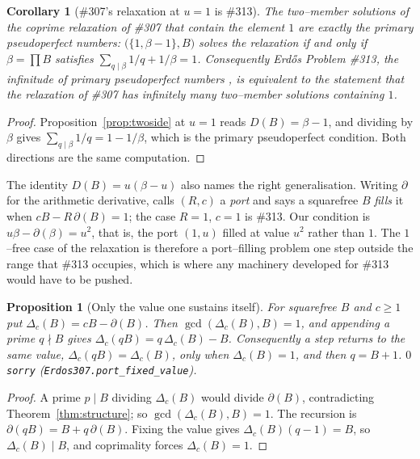 \documentclass[11pt]{article}
\newtheorem{proposition}[theorem]{Proposition}
\newtheorem{corollary}[theorem]{Corollary}
\theoremstyle{definition}
\begin{document}
\begin{corollary}[\#307's relaxation at $u=1$ is \#313]\label{cor:threethirteen}
The two--member solutions of the coprime relaxation of \#307 that contain the element $1$ are exactly
the primary pseudoperfect numbers: $\bigl(\{1,\beta-1\},B\bigr)$ solves the relaxation if and only if
$\beta=\prod B$ satisfies $\sum_{q\mid\beta}1/q+1/\beta=1$. Consequently Erd\H{o}s Problem \#313,
the infinitude of primary pseudoperfect numbers \cite{ButskeJajeMayernik}, is equivalent to the
statement that the relaxation of \#307 has infinitely many two--member solutions containing $1$.
\end{corollary}
\begin{proof}
Proposition~\ref{prop:twoside} at $u=1$ reads $D(B)=\beta-1$, and dividing by $\beta$ gives
$\sum_{q\mid\beta}1/q=1-1/\beta$, which is the primary pseudoperfect condition. Both directions are
the same computation.
\end{proof}

The identity $D(B)=u(\beta-u)$ also names the right generalisation. Writing $\partial$ for the
arithmetic derivative, \cite{PortFillings2026} calls $(R,c)$ a \emph{port} and says a squarefree $B$
\emph{fills} it when $cB-R\,\partial(B)=1$; the case $R=1$, $c=1$ is \#313. Our condition is
$u\beta-\partial(\beta)=u^{2}$, that is, the port $(1,u)$ filled at value $u^{2}$ rather than $1$.
The $1$--free case of the relaxation is therefore a port--filling problem one step outside the range
that \#313 occupies, which is where any machinery developed for \#313 would have to be pushed.

\begin{proposition}[Only the value one sustains itself]\label{prop:portfixed}
For squarefree $B$ and $c\ge1$ put $\Delta_c(B)=cB-\partial(B)$. Then $\gcd(\Delta_c(B),B)=1$, and
appending a prime $q\nmid B$ gives $\Delta_c(qB)=q\,\Delta_c(B)-B$. Consequently a step returns to
the same value, $\Delta_c(qB)=\Delta_c(B)$, only when $\Delta_c(B)=1$, and then $q=B+1$. $0$
\texttt{sorry} \textup{(\texttt{Erdos307.port\_fixed\_value})}.
\end{proposition}
\begin{proof}
A prime $p\mid B$ dividing $\Delta_c(B)$ would divide $\partial(B)$, contradicting
Theorem~\ref{thm:structure}; so $\gcd(\Delta_c(B),B)=1$. The recursion is
$\partial(qB)=B+q\,\partial(B)$. Fixing the value gives $\Delta_c(B)(q-1)=B$, so $\Delta_c(B)\mid B$,
and coprimality forces $\Delta_c(B)=1$.
\end{proof}
\end{document}
